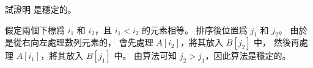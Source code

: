 \startEXERCISE
試證明  是穩定的。
\stopEXERCISE

\startANSWER
假定兩個下標爲 $i_1$ 和 $i_2$，且 $i_1 < i_2$ 的元素相等。
排序後位置爲 $j_1$ 和 $j_2$。
由於  是從右向左處理數列元素的，
會先處理 $A[i_2]$，將其放入 $B[j_2]$ 中，
然後再處理 $A[i_1]$，將其放入 $B[j_1]$ 中。
由算法可知 $j_2 > j_1$，因此算法是穩定的。
\stopANSWER
